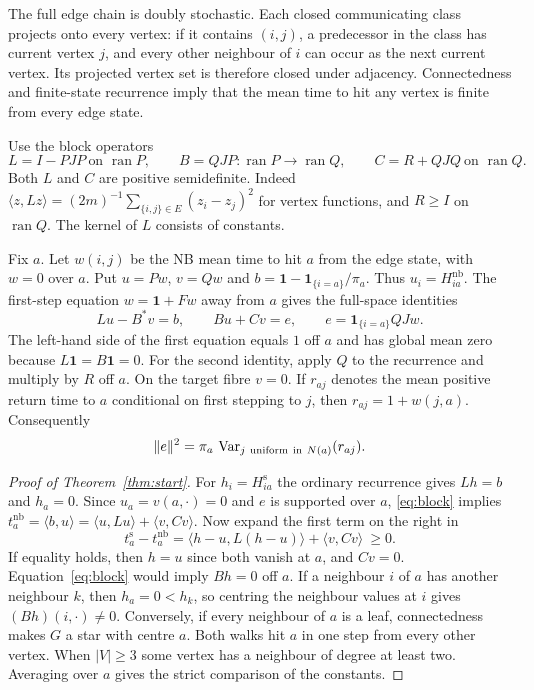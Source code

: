 \documentclass[11pt]{article}
\newcommand{\nb}{\mathrm{nb}}
\newcommand{\sr}{\mathrm{s}}
\newcommand{\one}{\mathbf 1}
\newcommand{\ip}[2]{\langle #1,#2\rangle}
\newcommand{\var}{\operatorname{Var}}
\newcommand{\ran}{\operatorname{ran}}
\begin{document}
The full edge chain is doubly stochastic. Each closed communicating class
projects onto every vertex: if it contains $(i,j)$, a predecessor in the
class has current vertex $j$, and every other neighbour of $i$ can occur
as the next current vertex. Its projected vertex set is therefore closed
under adjacency. Connectedness and finite-state recurrence imply that the
mean time to hit any vertex is finite from every edge state.

Use the block operators
\[
 L=I-PJP\ \text{on }\ran P,\qquad B=QJP:\ran P\to\ran Q,\qquad
 C=R+QJQ\ \text{on }\ran Q .
\]
Both $L$ and $C$ are positive semidefinite. Indeed
$\ip z{Lz}=(2m)^{-1}\sum_{\{i,j\}\in E}(z_i-z_j)^2$ for vertex
functions, and $R\ge I$ on $\ran Q$. The kernel of $L$ consists of constants.

Fix $a$. Let $w(i,j)$ be the NB mean time to hit $a$ from the edge state,
with $w=0$ over $a$. Put $u=Pw$, $v=Qw$ and
$b=\one-\one_{\{i=a\}}/\pi_a$. Thus $u_i=H^\nb_{ia}$. The first-step
equation $w=\one+Fw$ away from $a$ gives the full-space identities
\begin{equation}\label{eq:block}
 Lu-B^*v=b,\qquad Bu+Cv=e,\qquad e=\one_{\{i=a\}} QJw .
\end{equation}
The left-hand side of the first equation equals $1$ off $a$ and has
global mean zero because $L\one=B\one=0$. For the second identity, apply
$Q$ to the recurrence and multiply by $R$ off $a$. On the target fibre
$v=0$. If $r_{aj}$ denotes the mean positive return time to $a$ conditional
on first stepping to $j$, then $r_{aj}=1+w(j,a)$. Consequently
\begin{equation}\label{eq:variance}
 \|e\|^2=\pi_a\,\var_{j\ {\rm uniform\ in}\ N(a)}(r_{aj}).
\end{equation}

\begin{proof}[Proof of Theorem~\ref{thm:start}]
For $h_i=H^\sr_{ia}$ the ordinary recurrence gives $Lh=b$ and $h_a=0$.
Since $u_a=v(a,\cdot)=0$ and $e$ is supported over $a$,
\eqref{eq:block} implies $t^\nb_a=\ip b u=\ip u{Lu}+\ip v{Cv}$.
Now expand the first term on the right in
\begin{equation}\label{eq:first}
 t^\sr_a-t^\nb_a=\ip{h-u}{L(h-u)}+\ip v{Cv}\ \ge0 .
\end{equation}
If equality holds, then $h=u$ since both vanish at $a$, and $Cv=0$.
Equation~\eqref{eq:block} would imply $Bh=0$ off $a$. If a neighbour
$i$ of $a$ has another neighbour $k$, then $h_a=0<h_k$, so centring
the neighbour values at $i$ gives $(Bh)(i,\cdot)\ne0$. Conversely, if
every neighbour of $a$ is a leaf, connectedness makes $G$ a star with
centre $a$. Both walks hit $a$ in one step from every other vertex.
When $|V|\ge3$ some vertex has a neighbour of degree at least two.
Averaging over $a$ gives the strict comparison of the constants.
\end{proof}
\end{document}
